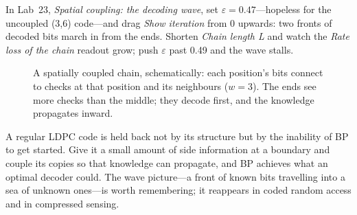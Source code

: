 \begin{tryit}
In Lab~23, \emph{Spatial coupling: the decoding wave}, set $\varepsilon=0.47$---hopeless for the
uncoupled (3,6) code---and drag \emph{Show iteration} from 0 upwards: two fronts of decoded bits
march in from the ends. Shorten \emph{Chain length L} and watch the \emph{Rate loss of the chain}
readout grow; push $\varepsilon$ past 0.49 and the wave stalls.
\end{tryit}

\begin{figure}[H]\centering
{}
\caption{A spatially coupled chain, schematically: each position's bits connect to checks at that
position and its neighbours ($w=3$). The ends see more checks than the middle; they decode first,
and the knowledge propagates inward.}
\label{fig:ch15_chain}\end{figure}

\begin{keyidea}
A regular LDPC code is held back not by its structure but by the inability of BP to get started.
Give it a small amount of side information at a boundary and couple its copies so that knowledge can
propagate, and BP achieves what an optimal decoder could. The wave picture---a front of known bits
travelling into a sea of unknown ones---is worth remembering; it reappears in coded random access and
in compressed sensing.
\end{keyidea}

